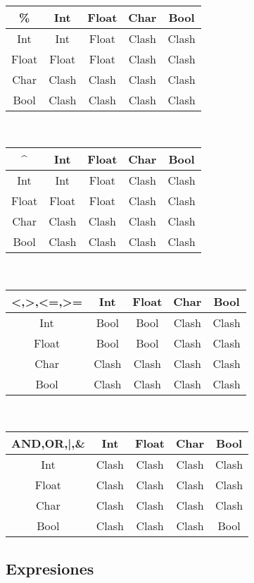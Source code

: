 \documentclass[12pt, spanish]{report}
\begin{document}
\\
\begin{tabular}{|c||cccc|}
	\hline
\%     &  Int  & Float & Char  & Bool  \\
	\hline \hline
Int    &  Int  & Float & Clash & Clash \\
Float  & Float & Float & Clash & Clash \\
Char   & Clash & Clash & Clash & Clash \\
Bool   & Clash & Clash & Clash & Clash \\
	\hline
\end{tabular}
\\
\begin{tabular}{|c||cccc|}
	\hline
\^     &  Int  & Float & Char  & Bool  \\
	\hline \hline
Int    &  Int  & Float & Clash & Clash \\
Float  & Float & Float & Clash & Clash \\
Char   & Clash & Clash & Clash & Clash \\
Bool   & Clash & Clash & Clash & Clash \\
	\hline
\end{tabular}
\\
\begin{tabular}{|c||cccc|}
	\hline
<,>,<=,>=&  Int  & Float & Char  & Bool  \\
	\hline \hline
Int      &  Bool &  Bool & Clash & Clash \\
Float    &  Bool &  Bool & Clash & Clash \\
Char     & Clash & Clash & Clash & Clash \\
Bool     & Clash & Clash & Clash & Clash \\
	\hline
\end{tabular}
\\
\begin{tabular}{|c||cccc|}
	    \hline
AND,OR,|,\& &  Int  & Float & Char  & Bool  \\ 
	    \hline \hline
Int         & Clash & Clash & Clash & Clash \\
Float       & Clash & Clash & Clash & Clash \\
Char        & Clash & Clash & Clash & Clash \\
Bool        & Clash & Clash & Clash & Bool \\
	\hline
\end{tabular}


\subsection{Expresiones}
\label{sec:expr}
\end{document}
